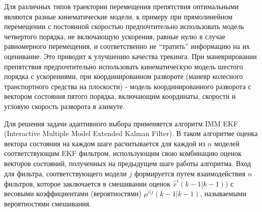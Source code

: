 \documentclass[14pt]{article}
\begin{document}
Для различных типов траектории перемещения препятствия оптимальными являются разные кинематические модели, к примеру при прямолинейном перемещении с постоянной скоростью предпочтительно использовать модель четвертого порядка, не включающую ускорения, равные нулю в случае равномерного перемещения, и соответственно не ``тратить'' информацию на их оценивание. Это приводит к улучшению качества трекинга. При маневрировании препятствия предпочтительно использовать кинематическую модель шестого порядка с ускорениями, при координированном развороте (маневр колесного транспортного средства на плоскости) - модель координированного разворота с вектором состояния пятого порядка, включающим координаты, скорости и угловую скорость разворота в азимуте. 

Для решения задачи адаптивного выбора применяется алгоритм IMM EKF (Interactive Multiple Model Extended Kalman Filter).
В таком алгоритме оценка вектора состояния на каждом шаге расчитывается для каждой из $n$ моделей соответствующим EKF фильтром, использующим свою комбинацию оценок векторов состояний, полученных на предыдущем шаге работы алгоритма. Вход для фильтра, соответствующего модели $j$ формируется путем взаимодействия $n$ фильтров, которое заключается в смешивании оценок $\hat{x}^i(k-1|k-1))$ с весовыми коэффициентами (вероятностями) $\mu^{i|j}(k-1|k-1)$, называемыми вероятностями смешивания.
\end{document}
